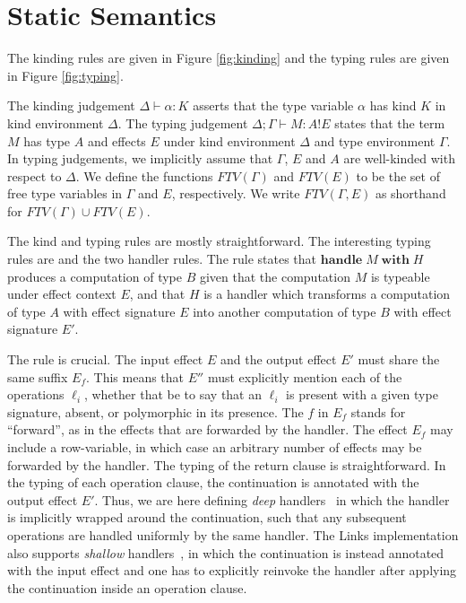\documentclass[mscres,icsa,lfcs,twoside,openright,logo,rightchapter,normalheadings]{infthesis}
\theoremstyle{definition}
\newcommand{\tylab}[1]{\text{\scshape{T-#1}}}
\newcommand{\keyw}[1]{\textbf{#1}}
\newcommand{\Handle}{\keyw{handle}}
\newcommand{\With}{\keyw{with}}
\newcommand{\eff}{\mathbin{!}}
\newcommand{\typ}[3]{#1 \vdash #2 \eff #3}
\begin{document}
\section{Static Semantics}
\label{sec:typing}
The kinding rules are given in Figure \ref{fig:kinding} and the typing
rules are given in Figure \ref{fig:typing}.

The kinding judgement $\Delta \vdash \alpha : K$ asserts that the type
variable $\alpha$ has kind $K$ in kind environment $\Delta$. The
typing judgement $\typ{\Delta;\Gamma}{M : A}{E}$ states that the term
$M$ has type $A$ and effects $E$ under kind environment $\Delta$ and
type environment $\Gamma$. In typing judgements, we implicitly assume
that $\Gamma$, $E$ and $A$ are well-kinded with respect to
$\Delta$. We define the functions $FTV(\Gamma)$ and $FTV(E)$ to be the
set of free type variables in $\Gamma$ and $E$, respectively. We write
$FTV(\Gamma,E)$ as shorthand for $FTV(\Gamma) \cup FTV(E)$.

The kind and typing rules are mostly straightforward. The interesting
typing rules are \tylab{Handle} and the two handler rules. The
\tylab{Handle} rule states that $\Handle\; M\; \With\; H$ produces a
computation of type $B$ given that the computation $M$ is typeable
under effect context $E$, and that $H$ is a handler which transforms a
computation of type $A$ with effect signature $E$ into another
computation of type $B$ with effect signature $E'$.

The \tylab{Handler} rule is crucial. The input effect $E$ and the
output effect $E'$ must share the same suffix $E_f$. This means that
$E''$ must explicitly mention each of the operations $\ell_i$, whether
that be to say that an $\ell_i$ is present with a given type
signature, absent, or polymorphic in its presence. The $f$ in $E_f$
stands for ``forward'', as in the effects that are forwarded by the
handler. The effect $E_f$ may include a row-variable, in which case an
arbitrary number of effects may be forwarded by the handler.
%
The typing of the return clause is straightforward. In the typing of
each operation clause, the continuation is annotated with the output
effect $E'$. Thus, we are here defining \emph{deep}
handlers~\cite{Kammar2013} in which the handler is implicitly wrapped
around the continuation, such that any subsequent operations are
handled uniformly by the same handler.
%
The Links implementation also supports \emph{shallow}
handlers~\cite{Kammar2013}, in which the continuation is instead
annotated with the input effect and one has to explicitly reinvoke the
handler after applying the continuation inside an operation clause.
\end{document}
